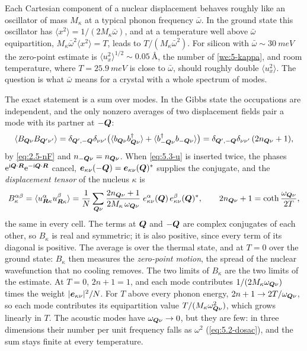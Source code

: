 Each Cartesian component of a nuclear displacement behaves roughly like an oscillator of mass $M_\kappa$ at a typical phonon frequency $\bar\omega$. In the ground state this oscillator has $\langle x^2\rangle = 1/(2M_\kappa\bar\omega)$, and at a temperature well above $\bar\omega$ equipartition, $M_\kappa\bar\omega^2\langle x^2\rangle = T$, leads to $T/(M_\kappa\bar\omega^2)$. For silicon with $\bar\omega \sim \SI{30}{meV}$ the zero-point estimate is $\langle u_x^2\rangle^{1/2} \sim \SI{0.05}{\angstrom}$, the number of \cref{we:5-kappa}, and room temperature, where $T = \SI{25.9}{meV}$ is close to $\bar\omega$, should roughly double $\langle u_x^2\rangle$. The question is what $\bar\omega$ means for a crystal with a whole spectrum of modes.

The exact statement is a sum over modes. In the Gibbs state the occupations are independent, and the only nonzero averages of two displacement fields pair a mode with its partner at $-\bm{Q}$:
\begin{equation*}
  \langle B_{\bm{Q}\nu}B_{\bm{Q}'\nu'}\rangle = \delta_{\bm{Q}',-\bm{Q}}\delta_{\nu\nu'}\bigl(\langle b_{\bm{Q}\nu}b^\dagger_{\bm{Q}\nu}\rangle + \langle b^\dagger_{-\bm{Q}\nu}b_{-\bm{Q}\nu}\rangle\bigr) = \delta_{\bm{Q}',-\bm{Q}}\delta_{\nu\nu'}\,(2n_{\bm{Q}\nu} + 1) ,
\end{equation*}
by \cref{eq:2.5-nF} and $n_{-\bm{Q}\nu} = n_{\bm{Q}\nu}$. When \cref{eq:5.3-u} is inserted twice, the phases $\mathrm{e}^{\mathrm{i}\bm{Q}\cdot\bm{R}}\mathrm{e}^{-\mathrm{i}\bm{Q}\cdot\bm{R}}$ cancel, $\bm{e}_{\kappa\nu}(-\bm{Q}) = \bm{e}_{\kappa\nu}(\bm{Q})^*$ supplies the conjugate, and the \emph{displacement tensor} of the nucleus $\kappa$ is
\begin{equation}
  B^{\alpha\beta}_\kappa = \langle u^\alpha_{\bm{R}\kappa}u^\beta_{\bm{R}\kappa}\rangle
  = \frac1N\sum_{\bm{Q}\nu}\frac{2n_{\bm{Q}\nu} + 1}{2M_\kappa\,\omega_{\bm{Q}\nu}}\;e^\alpha_{\kappa\nu}(\bm{Q})\,e^\beta_{\kappa\nu}(\bm{Q})^* ,
  \qquad 2n_{\bm{Q}\nu} + 1 = \coth\frac{\omega_{\bm{Q}\nu}}{2T} ,
  \label{eq:5.3-B}
\end{equation}
the same in every cell. The terms at $\bm{Q}$ and $-\bm{Q}$ are complex conjugates of each other, so $B_\kappa$ is real and symmetric; it is also positive, since every term of its diagonal is positive. The average is over the thermal state, and at $T = 0$ over the ground state: $B_\kappa$ then measures the \emph{zero-point motion}, the spread of the nuclear wavefunction that no cooling removes. The two limits of $B_\kappa$ are the two limits of the estimate. At $T = 0$, $2n + 1 = 1$, and each mode contributes $1/(2M_\kappa\omega_{\bm{Q}\nu})$ times the weight $|\bm{e}_{\kappa\nu}|^2/N$. For $T$ above every phonon energy, $2n + 1 \to 2T/\omega_{\bm{Q}\nu}$, so each mode contributes its equipartition value $T/(M_\kappa\omega^2_{\bm{Q}\nu})$, which grows linearly in $T$. The acoustic modes have $\omega_{\bm{Q}\nu} \to 0$, but they are few: in three dimensions their number per unit frequency falls as $\omega^2$ (\cref{eq:5.2-dosac}), and the sum stays finite at every temperature.

